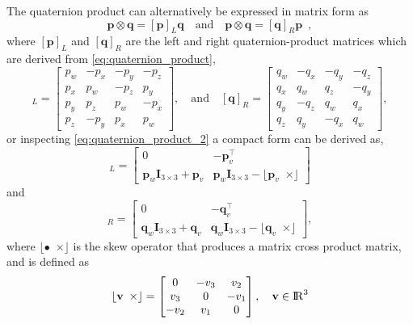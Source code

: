 \documentclass{article}
\renewcommand{\Vec}[1]{{\mathbf{#1}}}
\newcommand{\Mat}[1]{{\mathbf{#1}}}
\newcommand{\real}{{\rm I\!R}}
\newcommand{\I}{{\Mat{I}}}
\newcommand{\Skew}[1]{{\lfloor #1 \enspace \times \rfloor}}
\newcommand{\Transpose}[1]{{{#1^{\top}}}}
\begin{document}
The quaternion product can alternatively be expressed in matrix form as
%
\begin{equation}
  \Vec{p} \otimes \Vec{q} = [\Vec{p}]_{L} \Vec{q}
  \quad \text{and} \quad
  \Vec{p} \otimes \Vec{q} = [\Vec{q}]_{R} \Vec{p} \enspace ,
\end{equation}
%
where $[\Vec{p}]_{L}$ and $[\Vec{q}]_{R}$ are the left and right
quaternion-product matrices which are derived from
\eqref{eq:quaternion_product},
%
\begin{equation}
  [\Vec{p}]_{L} =
  \begin{bmatrix}
    p_w & -p_x & -p_y & -p_z \\
    p_x & p_w & -p_z & p_y \\
    p_y & p_z & p_w & -p_x \\
    p_z & -p_y & p_x & p_w
  \end{bmatrix},
  \quad \text{and} \quad
  [\Vec{q}]_{R} =
  \begin{bmatrix}
    q_w & -q_x & -q_y & -q_z \\
    q_x & q_w & q_z & -q_y \\
    q_y & -q_z & q_w & q_x \\
    q_z & q_y & -q_x & q_w
  \end{bmatrix},
\end{equation}
%
or inspecting \eqref{eq:quaternion_product_2} a compact form can be derived as,
%
\begin{equation}
  [\Vec{p}]_{L} =
  \begin{bmatrix}
    0 & -\Transpose{\Vec{p}_{v}} \\
    \Vec{p}_w \I_{3 \times 3} + \Vec{p}_{v} &
    \Vec{p}_w \I_{3 \times 3} -\Skew{\Vec{p}_{v}}
  \end{bmatrix}
\end{equation}
%
and
%
\begin{equation}
  [\Vec{q}]_{R} =
  \begin{bmatrix}
    0 & -\Transpose{\Vec{q}_{v}} \\
    \Vec{q}_w \I_{3 \times 3} + \Vec{q}_{v} &
    \Vec{q}_w \I_{3 \times 3} -\Skew{\Vec{q}_{v}}
  \end{bmatrix},
\end{equation}
%
where $\Skew{\bullet}$ is the skew operator that produces a matrix cross
product matrix, and is defined as
%
\begin{equation}
  \Skew{\Vec{v}} =
  \begin{bmatrix}
    0 & -v_{3} & v_{2} \\
    v_{3} & 0 & -v_{1} \\
    -v_{2} & v_{1} & 0
  \end{bmatrix},
  \quad
  \Vec{v} \in \real^{3}
\end{equation}
%
\end{document}
